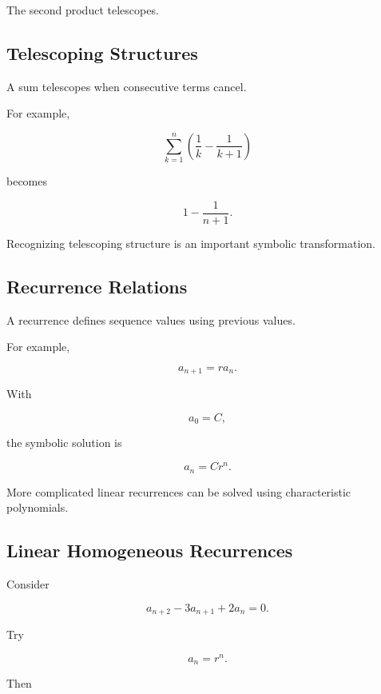 The second product telescopes.

\subsection{Telescoping Structures}
\label{subsec:symbolic-telescoping}

A sum telescopes when consecutive terms cancel.

For example,

\[
\sum_{k=1}^{n}
\left(
\frac1k
-
\frac1{k+1}
\right)
\]

becomes

\[
\boxed{
1-\frac1{n+1}.
}
\]

Recognizing telescoping structure is an important symbolic transformation.

\subsection{Recurrence Relations}
\label{subsec:symbolic-recurrence-relations}

A recurrence defines sequence values using previous values.

For example,

\[
\boxed{
a_{n+1}
=
ra_n.
}
\]

With

\[
a_0=C,
\]

the symbolic solution is

\[
\boxed{
a_n
=
Cr^n.
}
\]

More complicated linear recurrences can be solved using characteristic
polynomials.

\subsection{Linear Homogeneous Recurrences}
\label{subsec:linear-homogeneous-recurrences-symbolic}

Consider

\[
\boxed{
a_{n+2}
-
3a_{n+1}
+
2a_n
=
0.
}
\]

Try

\[
a_n=r^n.
\]

Then


